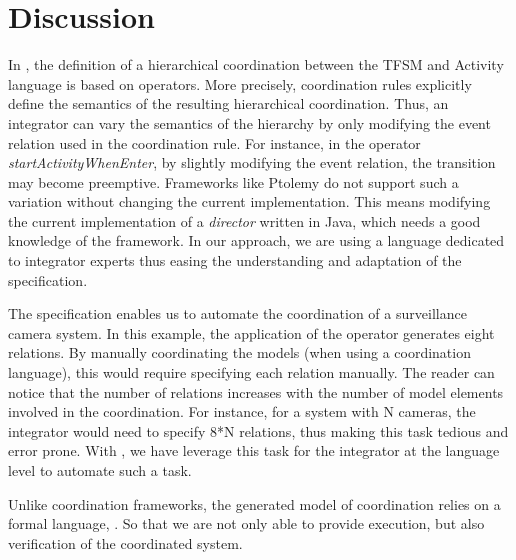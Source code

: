 \section{Discussion}
In \bcool, the definition of a hierarchical coordination between the TFSM and Activity language is based on operators. More precisely, coordination rules explicitly define the semantics of the resulting hierarchical coordination. Thus, an integrator can vary the semantics of the hierarchy by only modifying the event relation used in the coordination rule. For instance, in the operator \emph{startActivityWhenEnter}, by slightly modifying the event relation, the transition may become preemptive. Frameworks like Ptolemy do not support such a variation without changing the current implementation. This means modifying the current implementation of a \emph{director} written in Java, which needs a good knowledge of the framework. In our approach, we are using a language dedicated to integrator experts thus easing the understanding and adaptation of the \bcool specification.
		
The \bcool specification enables us to automate the coordination of a surveillance camera system. In this example, the application of the operator generates eight \ccsl relations. By manually coordinating the models (when using a coordination language), this would require specifying each relation manually. The reader can notice that the number of relations increases with the number of model elements involved in the coordination. For instance, for a system with N cameras, the integrator would need to specify 8*N relations, thus making this task tedious and error prone. With \bcool, we have leverage this task for the integrator at the language level to automate such a task.  
	
Unlike coordination frameworks, the generated model of coordination relies on a formal language, \ie \ccsl. So that we are not only able to provide execution, but also verification of the coordinated system. 